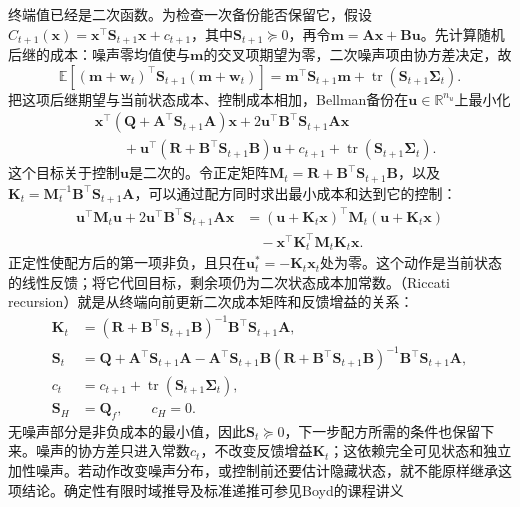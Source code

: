 终端值已经是二次函数。为检查一次备份能否保留它，假设$C_{t+1}(\bm x)=\bm x^\top\bm S_{t+1}\bm x+c_{t+1}$，其中$\bm S_{t+1}\succeq0$，再令$\bm m=\bm A\bm x+\bm B\bm u$。先计算随机后继的成本：噪声零均值使与$\bm m$的交叉项期望为零，二次噪声项由协方差决定，故
\[
 \mathbb E[(\bm m+\bm w_t)^\top\bm S_{t+1}(\bm m+\bm w_t)]
 =\bm m^\top\bm S_{t+1}\bm m+
   \operatorname{tr}(\bm S_{t+1}\bm\Sigma_t).
\]
把这项后继期望与当前状态成本、控制成本相加，Bellman备份在$\bm u\in\mathbb R^{n_u}$上最小化
\[
 \begin{aligned}
 &\bm x^\top(\bm Q+\bm A^\top\bm S_{t+1}\bm A)\bm x
 +2\bm u^\top\bm B^\top\bm S_{t+1}\bm A\bm x\\
 &\qquad+\bm u^\top(\bm R+\bm B^\top\bm S_{t+1}\bm B)\bm u
 +c_{t+1}+\operatorname{tr}(\bm S_{t+1}\bm\Sigma_t).
 \end{aligned}
 \]
这个目标关于控制$\bm u$是二次的。令正定矩阵$\bm M_t=\bm R+\bm B^\top\bm S_{t+1}\bm B$，以及
$\bm K_t=\bm M_t^{-1}\bm B^\top\bm S_{t+1}\bm A$，可以通过配方同时求出最小成本和达到它的控制：
\[
 \begin{aligned}
 \bm u^\top\bm M_t\bm u+
 2\bm u^\top\bm B^\top\bm S_{t+1}\bm A\bm x
 &=(\bm u+\bm K_t\bm x)^\top\bm M_t(\bm u+\bm K_t\bm x)\\
 &\quad-\bm x^\top\bm K_t^\top\bm M_t\bm K_t\bm x.
 \end{aligned}
 \]
正定性使配方后的第一项非负，且只在$\bm u_t^*=-\bm K_t\bm x_t$处为零。这个动作是当前状态的线性反馈；将它代回目标，剩余项仍为二次状态成本加常数。（Riccati recursion）就是从终端向前更新二次成本矩阵和反馈增益的关系：
\begin{equation}
 \begin{aligned}
 \bm K_t&=(\bm R+\bm B^\top\bm S_{t+1}\bm B)^{-1}
                \bm B^\top\bm S_{t+1}\bm A,\\
 \bm S_t&=\bm Q+\bm A^\top\bm S_{t+1}\bm A
   -\bm A^\top\bm S_{t+1}\bm B
      (\bm R+\bm B^\top\bm S_{t+1}\bm B)^{-1}
      \bm B^\top\bm S_{t+1}\bm A,\\
 c_t&=c_{t+1}+\operatorname{tr}(\bm S_{t+1}\bm\Sigma_t),\\
 \bm S_H&=\bm Q_f,\qquad c_H=0.
 \end{aligned}
 \label{eq:rl-planning-riccati}
\end{equation}
无噪声部分是非负成本的最小值，因此$\bm S_t\succeq0$，下一步配方所需的条件也保留下来。噪声的协方差只进入常数$c_t$，不改变反馈增益$\bm K_t$；这依赖完全可见状态和独立加性噪声。若动作改变噪声分布，或控制前还要估计隐藏状态，就不能原样继承这项结论。确定性有限时域推导及标准递推可参见Boyd的课程讲义

